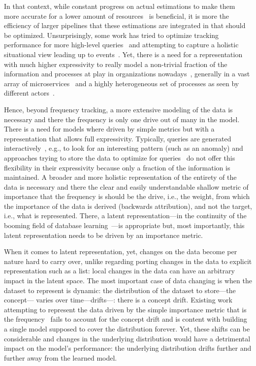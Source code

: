 % 
In that context, while constant progress on actual estimations to make them more accurate for a lower amount of resources~\cite{huang2018sketchlearn,li2020wavingsketch} is beneficial, it is more the efficiency of larger pipelines that these estimations are integrated in that should be optimized. Unsurprisingly, some work has tried to optimize tracking performance for more high-level queries~\cite{zhao2021cluster,zhang2021cocosketch} and attempting to capture a holistic situational view leading up to events~\cite{husak2021system}. Yet, there is a need for a representation with much higher expressivity to really model a non-trivial fraction of the information and processes at play in organizations nowadays~\cite{turunen2021minimum}, generally in a vast array of microservices~\cite{debroy2019overcoming} and a highly heterogeneous set of processes as seen by different actors~\cite{sousa2019managing}.

Hence, beyond frequency tracking, a more extensive modeling of the data is necessary and there the frequency is only one drive out of many in the model. There is a need for models where driven by simple metrics but with a representation that allows full expressivity. Typically, queries are generated interactively~\cite{kraska2021northstar}, e.g., to look for an interesting pattern (such as an anomaly) and approaches trying to store the data to optimize for queries~\cite{zhao2021cluster,zhang2021cocosketch} do not offer this flexibility in their expressivity because only a fraction of the information is maintained. A broader and more holistic representation of the entirety of the data is necessary and there the clear and easily understandable shallow metric of importance that the frequency is should be the drive, i.e., the weight, from which the importance of the data is derived (backwards attribution), and not the target, i.e., what is represented. There, a latent representation---in the continuity of the booming field of database learning~\cite{hilprecht2019deepdb,hasan2020deep}---is appropriate but, most importantly, this latent representation needs to be driven by an importance metric.


When it comes to latent representation, yet, changes on the data become per nature hard to carry over, unlike regarding porting changes in the data to explicit representation such as a list: local changes in the data can have an arbitrary impact in the latent space. The most important case of data changing is when the dataset to represent is dynamic: the distribution of the dataset to store---the concept--- varies over time---drifts---: there is a concept drift.
%
Existing work attempting to represent the data driven by the simple importance metric that is the frequency~\cite{hsu2019learning} fails to account for the concept drift and is content with building a single model supposed to cover the distribution forever.
%
Yet, these shifts can be considerable and changes in the underlying distribution would have a detrimental impact on the model's performance: the underlying distribution drifts further and further away from the learned model.


